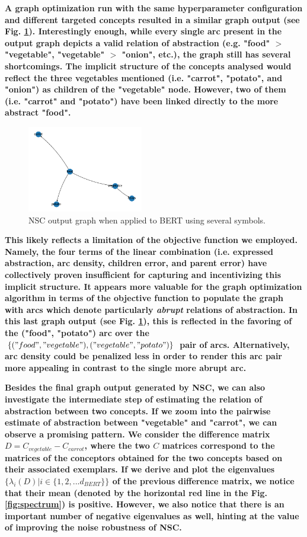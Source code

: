 \textbf{A graph optimization run with the same hyperparameter configuration and different targeted concepts resulted in a similar graph output (see Fig. \ref{fig:valuable}). Interestingly enough, while every single arc present in the output graph depicts a valid relation of abstraction (e.g. "food" $>$ "vegetable", "vegetable" $>$ "onion", etc.), the graph still has several shortcomings. The implicit structure of the concepts analysed would reflect the three vegetables mentioned (i.e. "carrot", "potato", and "onion") as children of the "vegetable" node. However, two of them (i.e. "carrot" and "potato") have been linked directly to the more abstract "food".}

\begin{figure}[h]
    \centering
    \includegraphics[width=0.45\textwidth]{img/valuable contrasts.png}
    \caption{NSC output graph when applied to BERT using several symbols.}\label{fig:valuable}
\end{figure}

\textbf{This likely reflects a limitation of the objective function we employed. Namely, the four terms of the linear combination (i.e. expressed abstraction, arc density, children error, and parent error) have collectively proven insufficient for capturing and incentivizing this implicit structure. It appears more valuable for the graph optimization algorithm in terms of the objective function to populate the graph with arcs which denote particularly \textit{abrupt} relations of abstraction. In this last graph output (see Fig. \ref{fig:valuable}), this is reflected in the favoring of the ("food", "potato") arc over the $\{("food", "vegetable"), ("vegetable", "potato")\}$ pair of arcs. Alternatively, arc density could be penalized less in order to render this arc pair more appealing in contrast to the single more abrupt arc.}

\textbf{Besides the final graph output generated by NSC, we can also investigate the intermediate step of estimating the relation of abstraction between two concepts. If we zoom into the pairwise estimate of abstraction between "vegetable" and "carrot", we can observe a promising pattern. We consider the difference matrix $D = C_{vegetable} - C_{carrot}$, where the two $C$ matrices correspond to the matrices of the conceptors obtained for the two concepts based on their associated exemplars. If we derive and plot the eigenvalues $\{\lambda_{i}(D)|i \in \{1, 2, ... d_{BERT}\}\}$ of the previous difference matrix, we notice that their mean (denoted by the horizontal red line in the Fig. \ref{fig:spectrum}) is positive. However, we also notice that there is an important number of negative eigenvalues as well, hinting at the value of improving the noise robustness of NSC.}

